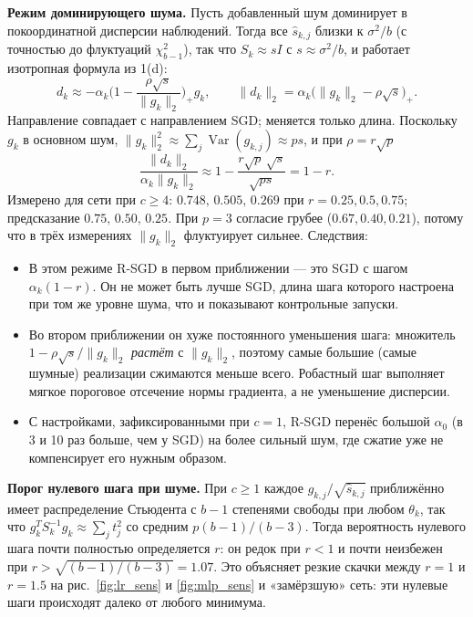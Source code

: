 \documentclass[11pt,a4paper]{article}
\newcommand{\norm}[1]{\lVert #1\rVert_2}
\DeclareMathOperator{\Var}{Var}
\begin{document}
\textbf{Режим доминирующего шума.} Пусть добавленный шум доминирует в покоординатной дисперсии
наблюдений. Тогда все $\widehat s_{k,j}$ близки к $\sigma^2/b$ (с точностью до флуктуаций
$\chi^2_{b-1}$), так что $S_k\approx sI$ с $s\approx\sigma^2/b$, и работает изотропная формула
из 1(d):
\begin{equation*}
d_k\approx-\alpha_k\Big(1-\frac{\rho\sqrt s}{\norm{g_k}}\Big)_+g_k,\qquad
\norm{d_k}=\alpha_k\big(\norm{g_k}-\rho\sqrt s\big)_+ .
\end{equation*}
Направление совпадает с направлением SGD; меняется только длина. Поскольку $g_k$ в основном
шум, $\norm{g_k}^2\approx\sum_j\Var(g_{k,j})\approx ps$, и при $\rho=r\sqrt p$
\begin{equation*}
\frac{\norm{d_k}}{\alpha_k\norm{g_k}}\approx1-\frac{r\sqrt p\,\sqrt s}{\sqrt{ps}}=1-r .
\end{equation*}
Измерено для сети при $c\ge4$: $0.748,\,0.505,\,0.269$ при $r=0.25,0.5,0.75$; предсказание
$0.75,\,0.50,\,0.25$. При $p=3$ согласие грубее ($0.67,0.40,0.21$), потому что в трёх измерениях
$\norm{g_k}$ флуктуирует сильнее. Следствия:
\begin{itemize}
\item В этом режиме R-SGD в первом приближении — это SGD с шагом $\alpha_k(1-r)$. Он не может
быть лучше SGD, длина шага которого настроена при том же уровне шума, что и показывают
контрольные запуски.
\item Во втором приближении он хуже постоянного уменьшения шага: множитель
$1-\rho\sqrt s/\norm{g_k}$ \emph{растёт} с $\norm{g_k}$, поэтому самые большие (самые шумные)
реализации сжимаются меньше всего. Робастный шаг выполняет мягкое пороговое отсечение нормы
градиента, а не уменьшение дисперсии.
\item С настройками, зафиксированными при $c=1$, R-SGD перенёс большой $\alpha_0$ (в 3 и 10 раз
больше, чем у SGD) на более сильный шум, где сжатие уже не компенсирует его нужным образом.
\end{itemize}

\textbf{Порог нулевого шага при шуме.} При $c\ge1$ каждое $g_{k,j}/\sqrt{\widehat s_{k,j}}$
приближённо имеет распределение Стьюдента с $b-1$ степенями свободы при любом $\theta_k$, так что
$g_k^TS_k^{-1}g_k\approx\sum_jt_j^2$ со средним $p(b-1)/(b-3)$. Тогда вероятность нулевого шага
почти полностью определяется $r$: он редок при $r<1$ и почти неизбежен при
$r>\sqrt{(b-1)/(b-3)}=1.07$. Это объясняет резкие скачки между $r=1$ и $r=1.5$ на
рис.~\ref{fig:lr_sens} и \ref{fig:mlp_sens} и «замёрзшую» сеть: эти нулевые шаги происходят
далеко от любого минимума.
\end{document}
